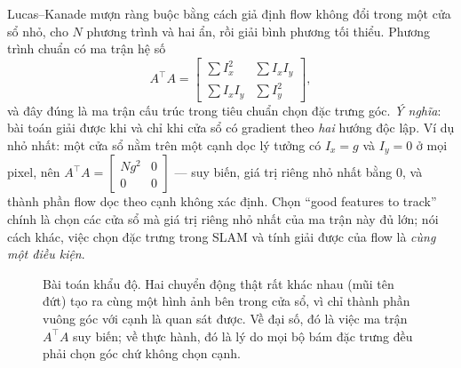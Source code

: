 \documentclass[../../../deep_learning.tex]{subfiles}
\begin{document}
Lucas--Kanade mượn ràng buộc bằng cách giả định flow không đổi trong một cửa sổ nhỏ, cho \(N\) phương trình và hai ẩn, rồi giải bình phương tối thiểu. Phương trình chuẩn có ma trận hệ số
\[
A^{\!\top}\!A=\begin{bmatrix}\sum I_x^2 & \sum I_x I_y\\[2pt] \sum I_x I_y & \sum I_y^2\end{bmatrix},
\]
và đây đúng là ma trận cấu trúc trong tiêu chuẩn chọn đặc trưng góc. \emph{Ý nghĩa}: bài toán giải được khi và chỉ khi cửa sổ có gradient theo \emph{hai} hướng độc lập. Ví dụ nhỏ nhất: một cửa sổ nằm trên một cạnh dọc lý tưởng có \(I_x = g\) và \(I_y = 0\) ở mọi pixel, nên \(A^{\!\top}\!A = \begin{bmatrix} Ng^2 & 0\\ 0 & 0\end{bmatrix}\) --- suy biến, giá trị riêng nhỏ nhất bằng 0, và thành phần flow dọc theo cạnh không xác định. 
Chọn ``good features to track'' chính là chọn các cửa sổ mà giá trị riêng nhỏ nhất của ma trận này đủ lớn; nói cách khác, việc chọn đặc trưng trong SLAM và tính giải được của flow là \emph{cùng một điều kiện}.

\begin{figure}[H]\centering
{}
\caption{Bài toán khẩu độ. Hai chuyển động thật rất khác nhau (mũi tên đứt) tạo ra cùng một hình ảnh bên trong cửa sổ, vì chỉ thành phần vuông góc với cạnh là quan sát được. Về đại số, đó là việc ma trận \(A^{\!\top}\!A\) suy biến; về thực hành, đó là lý do mọi bộ bám đặc trưng đều phải chọn góc chứ không chọn cạnh.}
\label{fig:aperture}
\end{figure}
\end{document}
